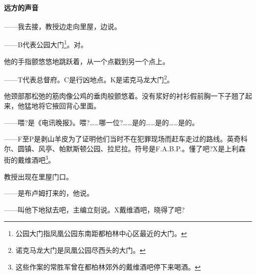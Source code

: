 \paragraph*{远方的声音}
\par ——我去接，教授边走向里屋，边说。
\par ——B代表公园大门\footnote{公园大门指凤凰公园东南距都柏林中心区最近的大门。}。对。
\par 他的手指颤悠悠地跳跃着，从一个点戳到另一个点上。
\par ——T代表总督府。C是行凶地点。K是诺克马龙大门\footnote{诺克马龙大门是凤凰公园尽西头的大门。}。
\par 他颈部那松弛的筋肉像公鸡的垂肉般颤悠着。没有浆好的衬衫假前胸一下子翘了起来，他猛地将它掖回背心里面。
\par ——喂?是《电讯晚报》。喂?……哪一位?……是的……是的……是的。
\par ——F至P是剥山羊皮为了证明他们当时不在犯罪现场而赶车走过的路线。英奇科尔、圆镇、风亭、帕默斯顿公园、拉尼拉。符号是F.A.B.P.。懂了吧?X是上利森街的戴维酒吧\footnote{这些作案的常胜军曾在都柏林郊外的戴维酒吧停下来喝酒。}。
\par 教授出现在里屋门口。
\par ——是布卢姆打来的，他说。
\par ——叫他下地狱去吧，主编立刻说。X戴维酒吧，晓得了吧?
